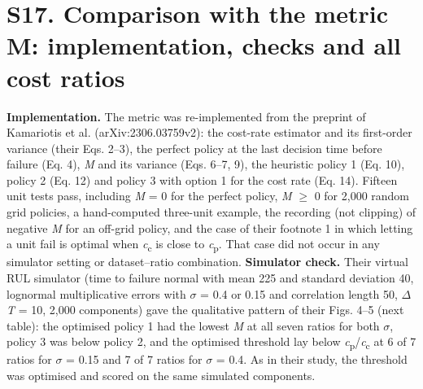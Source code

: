 \documentclass[11pt,a4paper]{article}
\begin{document}
\section*{S17. Comparison with the metric M: implementation, checks and all cost ratios}

\noindent \textbf{Implementation.} The metric was re-implemented from the preprint of Kamariotis et al. (arXiv:2306.03759v2): the cost-rate estimator and its first-order variance (their Eqs. 2--3), the perfect policy at the last decision time before failure (Eq. 4), \textit{M} and its variance (Eqs. 6--7, 9), the heuristic policy 1 (Eq. 10), policy 2 (Eq. 12) and policy 3 with option 1 for the cost rate (Eq. 14). Fifteen unit tests pass, including \textit{M} = 0 for the perfect policy, \textit{M} $\ge$ 0 for 2,000 random grid policies, a hand-computed three-unit example, the recording (not clipping) of negative \textit{M} for an off-grid policy, and the case of their footnote 1 in which letting a unit fail is optimal when \textit{c}\textsubscript{c} is close to \textit{c}\textsubscript{p}. That case did not occur in any simulator setting or dataset--ratio combination. \textbf{Simulator check.} Their virtual RUL simulator (time to failure normal with mean 225 and standard deviation 40, lognormal multiplicative errors with $\sigma$ = 0.4 or 0.15 and correlation length 50, $\Delta$\textit{T} = 10, 2,000 components) gave the qualitative pattern of their Figs. 4--5 (next table): the optimised policy 1 had the lowest \textit{M} at all seven ratios for both $\sigma$, policy 3 was below policy 2, and the optimised threshold lay below \textit{c}\textsubscript{p}/\textit{c}\textsubscript{c} at 6 of 7 ratios for $\sigma$ = 0.15 and 7 of 7 ratios for $\sigma$ = 0.4. As in their study, the threshold was optimised and scored on the same simulated components.
\end{document}
